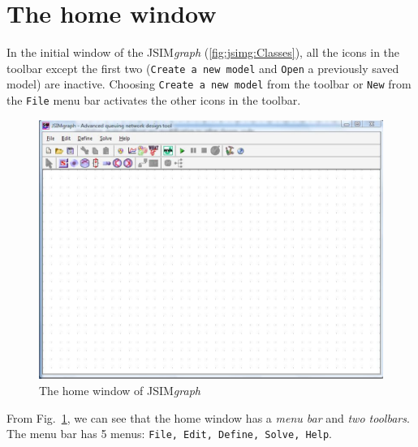 \section{The home window} In the initial window of the
JSIM\emph{graph} (\autoref{fig:jsimg:Classes}), all the icons in
the toolbar except the first two (\texttt{Create a new model} and
\texttt{Open} a previously saved model) are inactive. Choosing
\texttt{Create a new model} from the toolbar or \texttt{New} from
the \texttt{File} menu bar activates the other icons in the
toolbar.
\begin{figure}[htbp]
    \begin{center}
        \includegraphics[scale=.5]{img/jsimg/2.1.eps}
    \end{center}
    \caption{The home window of JSIM\emph{graph}}
    \label{fig:jsimg:Classes}
\end{figure}
From Fig.~\ref{fig:jsimg:Classes}, we can see that the home window
has a \emph{menu bar} and \emph{two toolbars}. The menu bar has 5
menus: \texttt{File, Edit, Define,
Solve, Help}.\\

